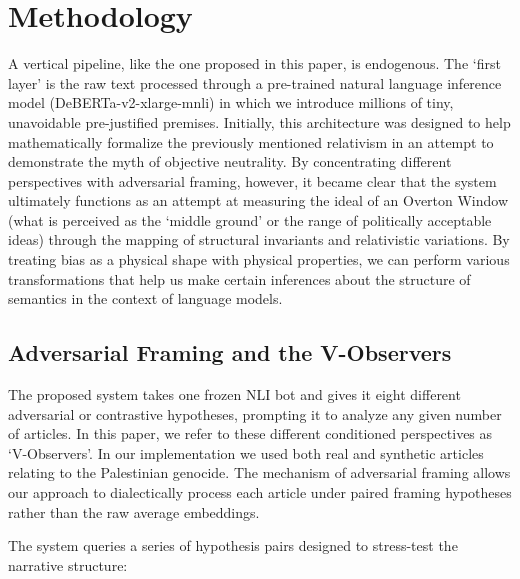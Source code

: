 \section{Methodology}

A vertical pipeline, like the one proposed in this paper, is endogenous. The `first layer' is the raw text processed through a pre-trained natural language inference model (DeBERTa-v2-xlarge-mnli) in which we introduce millions of tiny, unavoidable pre-justified premises. Initially, this architecture was designed to help mathematically formalize the previously mentioned relativism in an attempt to demonstrate the myth of objective neutrality. By concentrating different perspectives with adversarial framing, however, it became clear that the system ultimately functions as an attempt at measuring the ideal of an Overton Window (what is perceived as the `middle ground' or the range of politically acceptable ideas) through the mapping of structural invariants and relativistic variations. By treating bias as a physical shape with physical properties, we can perform various transformations that help us make certain inferences about the structure of semantics in the context of language models.

\subsection{Adversarial Framing and the V-Observers}

The proposed system takes one frozen NLI bot and gives it eight different adversarial or contrastive hypotheses, prompting it to analyze any given number of articles. In this paper, we refer to these different conditioned perspectives as `V-Observers'. In our implementation we used both real and synthetic articles relating to the Palestinian genocide. The mechanism of adversarial framing allows our approach to dialectically process each article under paired framing hypotheses rather than the raw average embeddings. 

The system queries a series of hypothesis pairs designed to stress-test the narrative structure:


